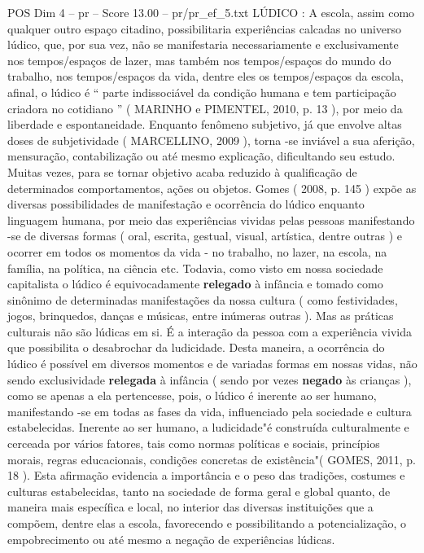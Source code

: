 \begin{textsample}{POS Dim 4 – pr – Score 13.00 – pr/pr\_ef\_5.txt}
LÚDICO : A escola, assim como qualquer outro espaço citadino, possibilitaria experiências calcadas no universo lúdico, que, por sua vez, não se manifestaria necessariamente e exclusivamente nos tempos/espaços de lazer, mas também nos tempos/espaços do mundo do trabalho, nos tempos/espaços da vida, dentre eles os tempos/espaços da escola, afinal, o lúdico é “ parte indissociável da condição humana e tem participação criadora no cotidiano ” ( MARINHO e PIMENTEL, 2010, p. 13 ), por meio da liberdade e espontaneidade.
Enquanto fenômeno subjetivo, já que envolve altas doses de subjetividade ( MARCELLINO, 2009 ), torna -se inviável a sua aferição, mensuração, contabilização ou até mesmo explicação, dificultando seu estudo.
Muitas vezes, para se tornar objetivo acaba reduzido à qualificação de determinados comportamentos, ações ou objetos.
Gomes ( 2008, p. 145 ) expõe as diversas possibilidades de manifestação e ocorrência do lúdico enquanto linguagem humana, por meio das experiências vividas pelas pessoas manifestando -se de diversas formas ( oral, escrita, gestual, visual, artística, dentre outras ) e ocorrer em todos os momentos da vida - no trabalho, no lazer, na escola, na família, na política, na ciência etc.
Todavia, como visto em nossa sociedade capitalista o lúdico é equivocadamente \textbf{relegado} à infância e tomado como sinônimo de determinadas manifestações da nossa cultura ( como festividades, jogos, brinquedos, danças e músicas, entre inúmeras outras ).
Mas as práticas culturais não são lúdicas em si.
É a interação da pessoa com a experiência vivida que possibilita o desabrochar da ludicidade.
Desta maneira, a ocorrência do lúdico é possível em diversos momentos e de variadas formas em nossas vidas, não sendo exclusividade \textbf{relegada} à infância ( sendo por vezes \textbf{negado} às crianças ), como se apenas a ela pertencesse, pois, o lúdico é inerente ao ser humano, manifestando -se em todas as fases da vida, influenciado pela sociedade e cultura estabelecidas.
Inerente ao ser humano, a ludicidade"é construída culturalmente e cerceada por vários fatores, tais como normas políticas e sociais, princípios morais, regras educacionais, condições concretas de existência"( GOMES, 2011, p. 18 ).
Esta afirmação evidencia a importância e o peso das tradições, costumes e culturas estabelecidas, tanto na sociedade de forma geral e global quanto, de maneira mais específica e local, no interior das diversas instituições que a compõem, dentre elas a escola, favorecendo e possibilitando a potencialização, o empobrecimento ou até mesmo a negação de experiências lúdicas.

\end{textsample}
